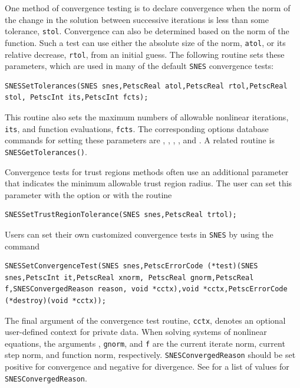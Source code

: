 One method of convergence testing is
to declare convergence when the norm of the change in the solution
between successive iterations is less than some tolerance, \lstinline{stol}.
Convergence can also be determined based on the norm of the function.
Such a test can use either the absolute size of the
norm, \lstinline{atol}, or its relative decrease, \lstinline{rtol}, from an initial
guess.  The following routine sets these parameters, which are used
in many of the default \lstinline{SNES} convergence tests:
\begin{lstlisting}
SNESSetTolerances(SNES snes,PetscReal atol,PetscReal rtol,PetscReal stol, PetscInt its,PetscInt fcts);
\end{lstlisting}
This routine also sets the maximum numbers of allowable
nonlinear iterations, \lstinline{its}, and function evaluations, \lstinline{fcts}.
The corresponding options database commands for setting these parameters
are , , ,
   
 
, and .
A related routine is \lstinline{SNESGetTolerances()}.

Convergence tests for trust regions methods often use an additional
parameter that indicates the minimum allowable trust region radius.
The user can set this parameter with the option 
 or with the routine
\begin{lstlisting}
SNESSetTrustRegionTolerance(SNES snes,PetscReal trtol);
\end{lstlisting}

Users can set their own customized convergence tests in \lstinline{SNES} by using
the command
\begin{lstlisting}
SNESSetConvergenceTest(SNES snes,PetscErrorCode (*test)(SNES snes,PetscInt it,PetscReal xnorm, PetscReal gnorm,PetscReal f,SNESConvergedReason reason, void *cctx),void *cctx,PetscErrorCode (*destroy)(void *cctx));
\end{lstlisting}
The final argument of the convergence test routine, \lstinline{cctx},
denotes an optional user-defined context for private data.  When
solving systems of nonlinear equations, the arguments ,
\lstinline{gnorm}, and \lstinline{f} are the current iterate norm, current step
norm, and function norm, respectively.
\break\lstinline{SNESConvergedReason} should be set positive
for convergence and negative for divergence. See 
for a list of values for \lstinline{SNESConvergedReason}.

